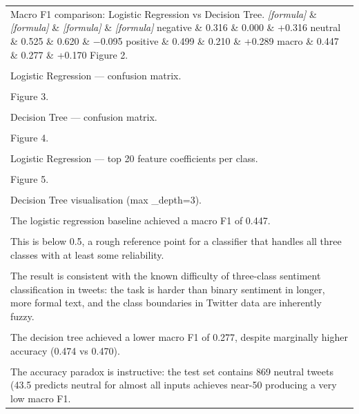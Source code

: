 \documentclass[11pt]{article}
\begin{document}
\begin{longtable}{|p{\dimexpr\linewidth-2\tabcolsep-2\arrayrulewidth\relax}|}
\hline
\rule{0pt}{3.5cm} \\
\hline
Macro F1 comparison: Logistic Regression vs Decision Tree. \textit{[formula]} \& \textit{[formula]} \& \textit{[formula]} \& \textit{[formula]} negative \& 0.316 \& 0.000 \& +0.316 neutral \& 0.525 \& 0.620 \& −0.095 positive \& 0.499 \& 0.210 \& +0.289 macro \& 0.447 \& 0.277 \& +0.170 Figure 2. \\[2pt]
\hline
\rule{0pt}{3.5cm} \\
\hline
Logistic Regression --- confusion matrix. \\[2pt]
\hline
\rule{0pt}{3.5cm} \\
\hline
Figure 3. \\[2pt]
\hline
\rule{0pt}{3.5cm} \\
\hline
Decision Tree --- confusion matrix. \\[2pt]
\hline
\rule{0pt}{3.5cm} \\
\hline
Figure 4. \\[2pt]
\hline
\rule{0pt}{3.5cm} \\
\hline
Logistic Regression --- top 20 feature coefficients per class. \\[2pt]
\hline
\rule{0pt}{3.5cm} \\
\hline
Figure 5. \\[2pt]
\hline
\rule{0pt}{3.5cm} \\
\hline
Decision Tree visualisation (max \_depth=3). \\[2pt]
\hline
\rule{0pt}{3.5cm} \\
\hline
The logistic regression baseline achieved a macro F1 of 0.447. \\[2pt]
\hline
\rule{0pt}{3.5cm} \\
\hline
This is below 0.5, a rough reference point for a classifier that handles all three classes with at least some reliability. \\[2pt]
\hline
\rule{0pt}{3.5cm} \\
\hline
The result is consistent with the known difficulty of three-class sentiment classification in tweets: the task is harder than binary sentiment in longer, more formal text, and the class boundaries in Twitter data are inherently fuzzy. \\[2pt]
\hline
\rule{0pt}{3.5cm} \\
\hline
The decision tree achieved a lower macro F1 of 0.277, despite marginally higher accuracy (0.474 vs 0.470). \\[2pt]
\hline
\rule{0pt}{3.5cm} \\
\hline
The accuracy paradox is instructive: the test set contains 869 neutral tweets (43.5 predicts neutral for almost all inputs achieves near-50 producing a very low macro F1. \\[2pt]

\end{longtable}
\end{document}
